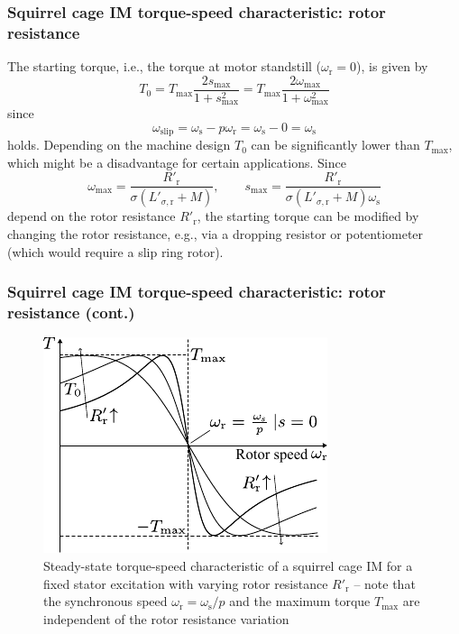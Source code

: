 \begin{frame}
	\frametitle{Squirrel cage IM torque-speed characteristic: rotor resistance} 
    The starting torque, i.e., the torque at motor standstill ($\omega_\mathrm{r}=0$), is given by
    \begin{equation}
        T_0 = T_\mathrm{max}  \frac{2s_\mathrm{max}}{1+s^2_\mathrm{max}} = T_\mathrm{max}  \frac{2\omega_\mathrm{max}}{1+\omega^2_\mathrm{max}}
    \end{equation}
    since 
    $$\omega_\mathrm{slip} = \omega_{\mathrm{s}} - p \omega_{\mathrm{r}} = \omega_{\mathrm{s}} - 0 = \omega_{\mathrm{s}} $$
    holds. \pause Depending on the machine design $T_0$ can be significantly lower than $T_\mathrm{max}$, which might be a disadvantage for certain applications. \pause Since
    $$\omega_\mathrm{max}=\frac{R'_\mathrm{r}}{\sigma (L'_{\sigma,\mathrm{r}} +M)}, \qquad s_\mathrm{max} = \frac{R'_\mathrm{r}}{\sigma (L'_{\sigma,\mathrm{r}} +M)\omega_\mathrm{s}} $$
    depend on the rotor resistance $R'_\mathrm{r}$, the starting torque can be modified by changing the rotor resistance, e.g., via a dropping resistor or potentiometer (which would require a slip ring rotor).
\end{frame}

\begin{frame}
	\frametitle{Squirrel cage IM torque-speed characteristic: rotor resistance (cont.)} 
    \begin{figure}
        \centering
        \includegraphics[height=0.65\textheight]{fig/lec06/Kloss_formula_starting_torque.pdf}
        \caption{Steady-state torque-speed characteristic of a squirrel cage IM for a fixed stator excitation with varying rotor resistance $R'_\mathrm{r}$ -- note that the synchronous speed $\omega_\mathrm{r}=\omega_\mathrm{s}/p$ and the maximum torque $T_\mathrm{max}$ are independent of the rotor resistance variation}
        \label{fig:Kloss_formula_starting_torque}
    \end{figure}
\end{frame}

